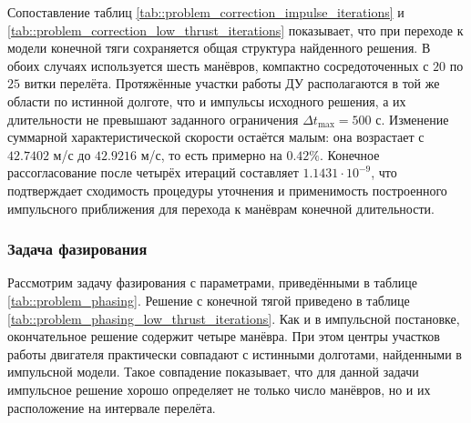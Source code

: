 Сопоставление таблиц \ref{tab::problem_correction_impulse_iterations} и \ref{tab::problem_correction_low_thrust_iterations} показывает, что при переходе к модели конечной тяги сохраняется общая структура найденного решения. В обоих случаях используется шесть манёвров, компактно сосредоточенных с $20$ по $25$ витки перелёта. Протяжённые участки работы ДУ располагаются в той же области по истинной долготе, что и импульсы исходного решения, а их длительности не превышают заданного ограничения $\Delta t_{\text{max}}=500$ с. Изменение суммарной характеристической скорости остаётся малым: она возрастает с $42.7402$ м/с до $42.9216$ м/с, то есть примерно на $0.42\%$. Конечное рассогласование после четырёх итераций составляет $1.1431 \cdot 10^{-9}$, что подтверждает сходимость процедуры уточнения и применимость построенного импульсного приближения для перехода к манёврам конечной длительности.

\subsubsection{Задача фазирования}

Рассмотрим задачу фазирования с параметрами, приведёнными в таблице \ref{tab::problem_phasing}. Решение с конечной тягой приведено в таблице \ref{tab::problem_phasing_low_thrust_iterations}. Как и в импульсной постановке, окончательное решение содержит четыре манёвра. При этом центры участков работы двигателя практически совпадают с истинными долготами, найденными в импульсной модели. Такое совпадение показывает, что для данной задачи импульсное решение хорошо определяет не только число манёвров, но и их расположение на интервале перелёта.

